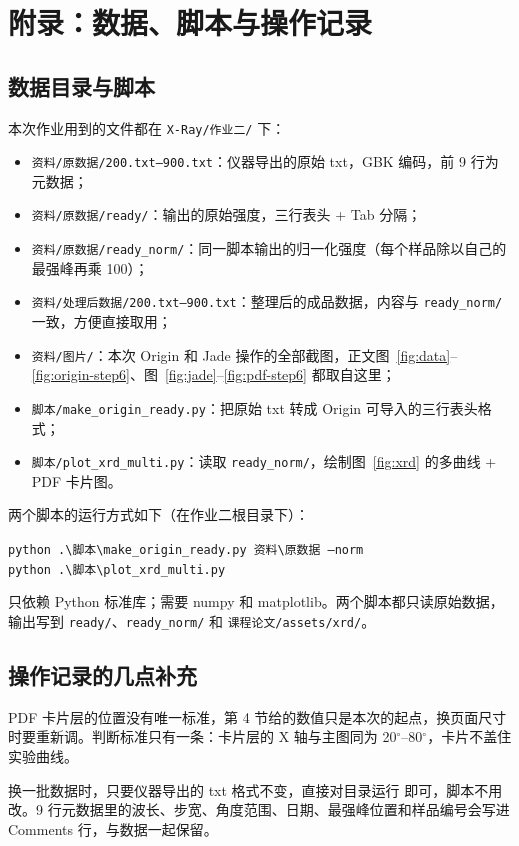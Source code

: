 \section{附录：数据、脚本与操作记录}

\subsection{数据目录与脚本}

本次作业用到的文件都在 \texttt{X-Ray/作业二/} 下：

\begin{itemize}[leftmargin=2.2em]
  \item \texttt{资料/原数据/200.txt--900.txt}：仪器导出的原始 txt，GBK 编码，前 9 行为元数据；
  \item \texttt{资料/原数据/ready/}：\pyA 输出的原始强度，三行表头 + Tab 分隔；
  \item \texttt{资料/原数据/ready\_norm/}：同一脚本输出的归一化强度（每个样品除以自己的最强峰再乘 100）；
  \item \texttt{资料/处理后数据/200.txt--900.txt}：整理后的成品数据，内容与 \texttt{ready\_norm/} 一致，方便直接取用；
  \item \texttt{资料/图片/}：本次 Origin 和 Jade 操作的全部截图，正文图~\ref{fig:data}--\ref{fig:origin-step6}、图~\ref{fig:jade}--\ref{fig:pdf-step6} 都取自这里；
  \item \texttt{脚本/make\_origin\_ready.py}：把原始 txt 转成 Origin 可导入的三行表头格式；
  \item \texttt{脚本/plot\_xrd\_multi.py}：读取 \texttt{ready\_norm/}，绘制图~\ref{fig:xrd} 的多曲线 + PDF 卡片图。
\end{itemize}

两个脚本的运行方式如下（在作业二根目录下）：

\begin{center}
\texttt{python .\textbackslash 脚本\textbackslash make\_origin\_ready.py 资料\textbackslash 原数据 --norm}\\
\vspace{2pt}
\texttt{python .\textbackslash 脚本\textbackslash plot\_xrd\_multi.py}
\end{center}

\pyA 只依赖 Python 标准库；\pyB 需要 numpy 和 matplotlib。两个脚本都只读原始数据，输出写到 \texttt{ready/}、\texttt{ready\_norm/} 和 \texttt{课程论文/assets/xrd/}。

\subsection{操作记录的几点补充}

PDF 卡片层的位置没有唯一标准，第 4 节给的数值只是本次的起点，换页面尺寸时要重新调。判断标准只有一条：卡片层的 X 轴与主图同为 20$^\circ$--80$^\circ$，卡片不盖住实验曲线。

换一批数据时，只要仪器导出的 txt 格式不变，直接对目录运行 \pyA 即可，脚本不用改。9 行元数据里的波长、步宽、角度范围、日期、最强峰位置和样品编号会写进 Comments 行，与数据一起保留。
